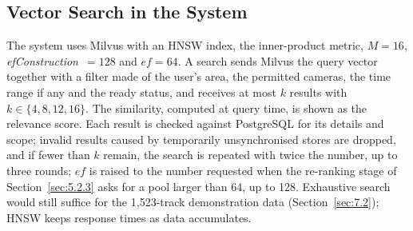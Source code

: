 \subsection{Vector Search in the System}
\label{sec:3.6.4}

The system uses Milvus with an HNSW index, the inner-product metric, $M = 16$, \textit{ef\-Con\-struc\-tion}~$= 128$ and $\mathit{ef} = 64$. A search sends Milvus the query vector together with a filter made of the user's area, the permitted cameras, the time range if any and the ready status, and receives at most $k$ results with $k \in \{4, 8, 12, 16\}$. The similarity, computed at query time, is shown as the relevance score. Each result is checked against PostgreSQL for its details and scope; invalid results caused by temporarily unsynchronised stores are dropped, and if fewer than $k$ remain, the search is repeated with twice the number, up to three rounds; $\mathit{ef}$ is raised to the number requested when the re-ranking stage of Section~\ref{sec:5.2.3} asks for a pool larger than 64, up to 128. Exhaustive search would still suffice for the 1,523-track demonstration data (Section~\ref{sec:7.2}); HNSW keeps response times as data accumulates.
